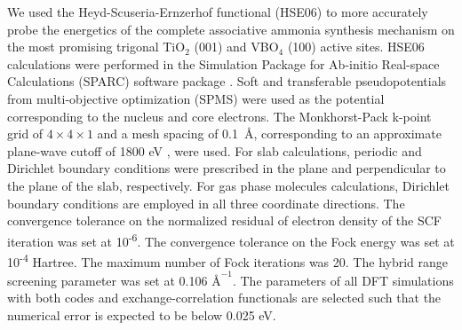 We used the Heyd-Scuseria-Ernzerhof functional (HSE06) \cite{hse} to more accurately probe the energetics of the complete associative ammonia synthesis mechanism on the most promising trigonal TiO$_2$ (001) and VBO$_4$ (100) active sites. HSE06 calculations were performed in the Simulation Package for Ab-initio Real-space Calculations (SPARC) software package \cite{SPARC, Ghosh2017SPARC:Systems, Xu2021SPARC:Calculations, Shojaei2022SoftOptimization, Suryanarayana2019AlternatingSystems, Pratapa2016AndersonSystems, Banerjee2016PeriodicIterations, Kumar2020OnTheory, Pratapa2015RestartedIterations}. Soft and transferable pseudopotentials from multi-objective optimization (SPMS) \cite{Shojaei2022SoftOptimization} were used as the potential corresponding to the nucleus and core electrons. The Monkhorst-Pack k-point grid of {$4\times4\times 1$} and a mesh spacing of 0.1\textup{~\AA}, corresponding to an approximate plane-wave cutoff of 1800 eV \cite{ Abinit}, were used. For slab calculations, periodic and Dirichlet boundary conditions were prescribed in the plane and perpendicular to the plane of the slab, respectively. For gas phase molecules calculations, Dirichlet boundary conditions are employed in all three coordinate directions. The convergence tolerance on the normalized residual of electron density of the SCF iteration was set at 10\textsuperscript{-6}. The convergence tolerance on the Fock energy was set at 10\textsuperscript{-4} Hartree. The maximum number of Fock iterations was 20. The hybrid range screening parameter was set at 0.106 $\text{\AA}^{-1}$\cite{hse, Krukau2006InfluenceFunctionals}. The parameters of all DFT simulations with both codes and exchange-correlation functionals are selected such that the numerical error is expected to be below 0.025 eV.

